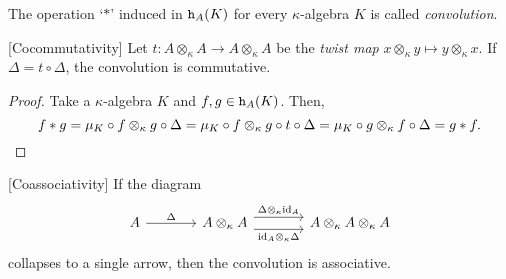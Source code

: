 \begin{defn}
    The operation `$*$' induced in $\mathtt h_A(K)$ for every $\kappa$-algebra $K$ is called \textsl{convolution}.
\end{defn}

\begin{lem}\label{lem:*-commutativity} {\rm[Cocommutativity]}
    Let\/ $t\colon A\otimes_\kappa A\to A\otimes_\kappa A$ be the \textsl{twist map}\/ $x\otimes_\kappa y\mapsto y\otimes_\kappa x$. If\/ $\Delta=t\circ\Delta$, the convolution is commutative.
\end{lem}

\begin{proof}
    Take a $\kappa$-algebra $K$ and $f,g\in\mathtt h_A(K)$. Then,
    \small
    $$
        f*g = \mu_K\circ f\otimes_\kappa g\circ\Delta = \mu_K\circ f\otimes_\kappa g\circ t\circ\Delta
            = \mu_K\circ g\otimes_\kappa f\circ\Delta = g*f. \qedhere
    $$
    \normalsize
\end{proof}

\begin{lem}\label{lem:*-associativity} {\rm[Coassociativity]}
    If the diagram
    \small
    $$
        \begin{tikzcd}[column sep = large]
            A
                    \arrow[r,"\Delta"]
                &A\otimes_\kappa A
                    \arrow[r,"\Delta\otimes_\kappa\id_A",
                        start anchor={[yshift=1ex]},
                        end anchor={[yshift=1ex]}]
                    \arrow[r,"\id_A\otimes_\kappa\Delta"',
                        start anchor={[yshift=-1ex]},
                        end anchor={[yshift=-1ex]}]
                &A\otimes_\kappa A\otimes_\kappa A
        \end{tikzcd}
    $$
    \normalsize
    collapses to a single arrow, then the convolution is associative.
\end{lem}

